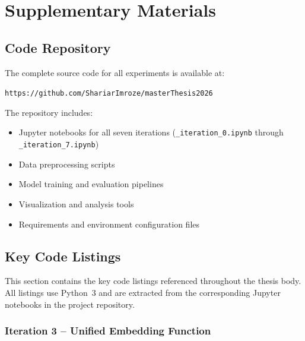 \documentclass[11pt, titlepage, bibliography=totoc]{scrreprt}
\begin{document}
\chapter{Supplementary Materials}

\section{Code Repository}

The complete source code for all experiments is available at:

\begin{center}
\texttt{https://github.com/ShariarImroze/masterThesis2026}
\end{center}

The repository includes:
\begin{itemize}
    \item Jupyter notebooks for all seven iterations (\texttt{\_iteration\_0.ipynb} through \texttt{\_iteration\_7.ipynb})
    \item Data preprocessing scripts
    \item Model training and evaluation pipelines
    \item Visualization and analysis tools
    \item Requirements and environment configuration files
\end{itemize}

\section{Key Code Listings}
\label{sec:code-listings}

This section contains the key code listings referenced throughout the thesis body. All listings use Python~3 and are extracted from the corresponding Jupyter notebooks in the project repository.

\subsection*{Iteration 3 -- Unified Embedding Function}
\end{document}
